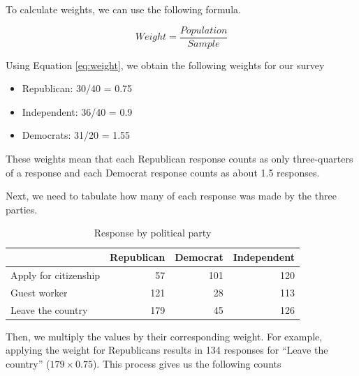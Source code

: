 \documentclass[
]{book}
\providecommand{\tightlist}{%
  \setlength{\itemsep}{0pt}\setlength{\parskip}{0pt}}
\begin{document}
To calculate weights, we can use the following formula.

\begin{equation}
Weight = \frac{Population}{Sample}
\label{eq:weight}
\end{equation}

Using Equation \eqref{eq:weight}, we obtain the following weights for our survey

\begin{itemize}
\tightlist
\item
  Republican: 30/40 = 0.75
\item
  Independent: 36/40 = 0.9
\item
  Democrats: 31/20 = 1.55
\end{itemize}

These weights mean that each Republican response counts as only three-quarters of a response and each Democrat response counts as about 1.5 responses.

Next, we need to tabulate how many of each response was made by the three parties.

\begin{table}

\caption{\label{tab:unnamed-chunk-269}Response by political party}
\centering
\begin{tabular}[t]{l|r|r|r}
\hline
  & Republican & Democrat & Independent\\
\hline
Apply for citizenship & 57 & 101 & 120\\
\hline
Guest worker & 121 & 28 & 113\\
\hline
Leave the country & 179 & 45 & 126\\
\hline
\end{tabular}
\end{table}

Then, we multiply the values by their corresponding weight. For example, applying the weight for Republicans results in 134 responses for ``Leave the country'' (\(179 \times 0.75\)). This process gives us the following counts
\end{document}
